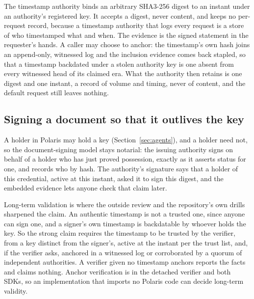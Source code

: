 The timestamp authority binds an arbitrary SHA3-256 digest to an instant under an authority's
registered key. It accepts a digest, never content, and keeps no per-request record, because a
timestamp authority that logs every request is a store of who timestamped what and when. The
evidence is the signed statement in the requester's hands. A caller may choose
to anchor: the timestamp's own hash joins an append-only, witnessed log and the inclusion evidence
comes back stapled, so that a timestamp backdated under a stolen authority key is one absent from
every witnessed head of its claimed era. What the authority then retains is one digest and one
instant, a record of volume and timing, never of content, and the default request still leaves
nothing. \sImpl

\subsection{Signing a document so that it outlives the key}

A holder in Polaris may hold a key (Section~\ref{sec:agents}), and a holder need not, so the
document-signing model stays notarial: the issuing authority signs on behalf of a holder who has just
proved possession, exactly as it asserts status for one, and records who by hash. The authority's
signature says that a holder of this credential, active at this instant, asked it to sign this
digest, and the embedded evidence lets anyone check that claim later. \sImpl

Long-term validation is where the outside review and the repository's own drills sharpened the
claim. An authentic timestamp is not a trusted one, since anyone can sign one, and a signer's own
timestamp is backdatable by whoever holds the key. So the strong claim requires the timestamp to be
trusted by the verifier, from a key distinct from the signer's, active at the instant per the trust
list, and, if the verifier asks, anchored in a witnessed log or corroborated by a quorum of
independent authorities. A verifier given no timestamp anchors reports the facts and claims nothing.
Anchor verification is in the detached verifier and both SDKs, so an implementation that imports no
Polaris code can decide long-term validity. \sImpl


